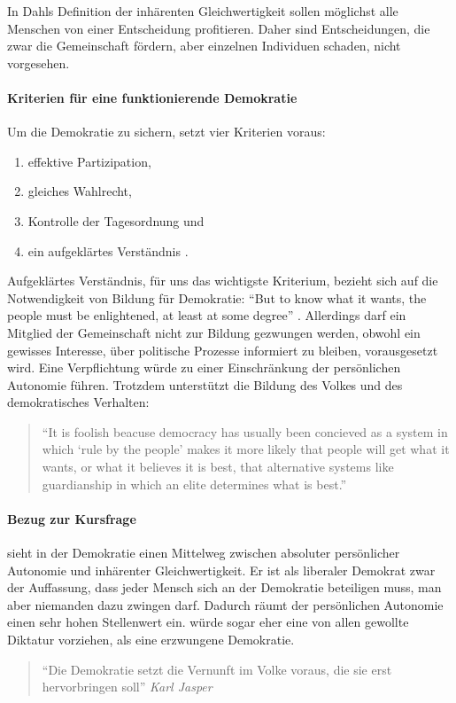 In Dahls Definition der inhärenten Gleichwertigkeit sollen möglichst alle Menschen von einer Entscheidung profitieren.
Daher sind Entscheidungen, die zwar die Gemeinschaft fördern, aber einzelnen Individuen schaden, nicht vorgesehen.


\paragraph{Kriterien für eine funktionierende Demokratie}

Um die Demokratie zu sichern, setzt \citeauthor{Dahl-1989-aa} vier Kriterien voraus:
	\begin{enumerate}
		\item effektive Partizipation,
		\item gleiches Wahlrecht,
		\item Kontrolle der Tagesordnung und
		\item ein aufgeklärtes Verständnis \parencite[vgl.][100]{Dahl-1989-aa}.
	\end{enumerate}

Aufgeklärtes Verständnis, für uns das wichtigste Kriterium, bezieht sich auf die Notwendigkeit von Bildung für Demokratie:
``But to know what it wants, the people must be enlightened, at least at some degree'' \parencite[100]{Dahl-1989-aa}.
Allerdings darf ein Mitglied der Gemeinschaft nicht zur Bildung gezwungen werden, obwohl ein gewisses Interesse, über politische Prozesse informiert zu bleiben, vorausgesetzt wird.
Eine Verpflichtung würde zu einer Einschränkung der persönlichen Autonomie führen.
Trotzdem unterstützt \citeauthor{Dahl-1989-aa} die Bildung des Volkes und des demokratisches Verhalten:

	\begin{quote}
		``It is foolish beacuse democracy has usually been concieved as a system in which `rule by the people' makes it more likely that people will get what it wants, or what it believes it is best, that alternative systems like guardianship in which an elite determines what is best.'' \parencite[111]{Dahl-1989-aa}
	\end{quote}


\paragraph{Bezug zur Kursfrage}

\citeauthor{Dahl-1989-aa} sieht in der Demokratie einen Mittelweg zwischen absoluter persönlicher Autonomie und inhärenter Gleichwertigkeit.
Er ist als liberaler Demokrat zwar der Auffassung, dass jeder Mensch sich an der Demokratie beteiligen muss, man aber niemanden dazu zwingen darf.
Dadurch räumt \citeauthor{Dahl-1989-aa} der persönlichen Autonomie einen sehr hohen Stellenwert ein.
\citeauthor{Dahl-1989-aa} würde sogar eher eine von allen gewollte Diktatur vorziehen, als eine erzwungene Demokratie.

	\begin{quote}
		``Die Demokratie setzt die Vernunft im Volke voraus, die sie erst hervorbringen soll'' \emph{Karl Jasper}
	\end{quote}